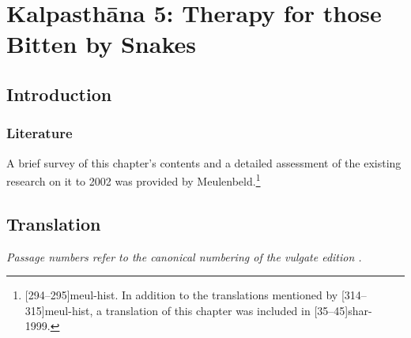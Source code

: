    
\chapter{Kalpasthāna 5: Therapy for those Bitten by Snakes}

\section{Introduction} 

\subsection{Literature}

A brief survey of this chapter's contents and a detailed assessment of
the existing research on it to 2002 was provided by
Meulenbeld.\footnote{[294--295]{meul-hist}. In addition to the
    translations mentioned by [314--315]{meul-hist}, a translation
    of this chapter was included in [35--45]{shar-1999}.} 
    
    
    \newpage
    
\section{Translation}

\emph{Passage numbers refer to the canonical numbering of the vulgate edition  
\citep{vulgate}.
}

